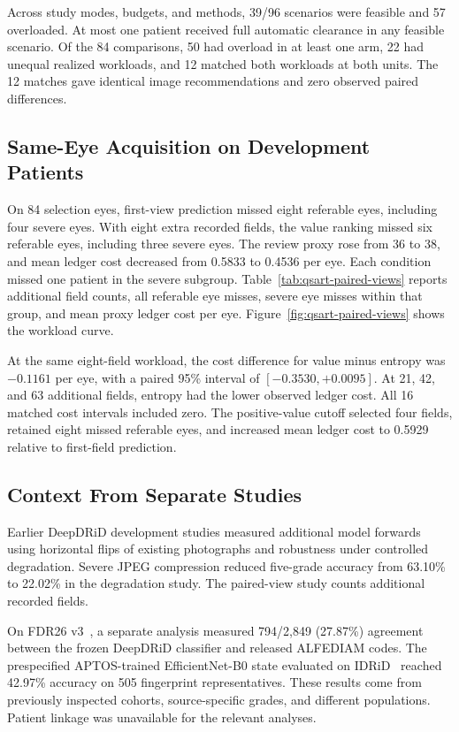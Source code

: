 \documentclass[conference]{IEEEtran}
\begin{document}
Across study modes, budgets, and methods, 39/96 scenarios were feasible
and 57 overloaded. At most one patient received full automatic clearance
in any feasible scenario. Of the 84 comparisons, 50 had overload in at
least one arm, 22 had unequal realized workloads, and 12 matched both
workloads at both units. The 12 matches gave identical image recommendations
and zero observed paired differences.

\subsection{Same-Eye Acquisition on Development Patients}
On 84 selection eyes, first-view prediction missed eight referable eyes,
including four severe eyes. With eight extra recorded fields, the value
ranking missed six referable eyes, including three severe eyes. The review
proxy rose from 36 to 38, and mean ledger cost decreased from 0.5833 to
0.4536 per eye. Each condition missed one patient in the severe subgroup.
Table~\ref{tab:qsart-paired-views} reports additional field counts, all
referable eye misses, severe eye misses within that group, and mean proxy
ledger cost per eye. Figure~\ref{fig:qsart-paired-views} shows the workload
curve.

At the same eight-field workload, the cost difference for value minus entropy
was $-0.1161$ per eye, with a paired 95\% interval of $[-0.3530,+0.0095]$.
At 21, 42, and 63 additional fields, entropy had the lower observed ledger
cost. All 16 matched cost intervals included zero. The positive-value cutoff
selected four fields, retained eight missed referable eyes, and increased
mean ledger cost to 0.5929 relative to first-field prediction.

\subsection{Context From Separate Studies}
Earlier DeepDRiD development studies measured additional model forwards
using horizontal flips of existing photographs and robustness under
controlled degradation. Severe JPEG compression reduced five-grade accuracy
from 63.10\% to 22.02\% in the degradation study. The paired-view study
counts additional recorded fields.

On FDR26 v3~\cite{FDR26v3}, a separate analysis measured 794/2,849 (27.87\%)
agreement between the frozen DeepDRiD classifier and released ALFEDIAM codes.
The prespecified APTOS-trained EfficientNet-B0 state evaluated on
IDRiD~\cite{R04} reached 42.97\% accuracy on 505 fingerprint representatives.
These results come from previously inspected cohorts, source-specific grades, and different
populations. Patient linkage was unavailable for the relevant analyses.
\end{document}
